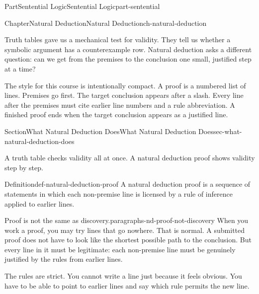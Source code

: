 \documentclass[oneside,10pt,]{book}
\newcommand{\terminology}[1]{\textbf{#1}}
\renewcommand{\terminology}[1]{#1}
\begin{document}
\begin{partptx}{Part}{Sentential Logic}{}{Sentential Logic}{}{}{part-sentential}
\renewcommand*{\partname}{Part}
%
%
\typeout{************************************************}
\typeout{************************************************}
%
\begin{chapterptx}{Chapter}{Natural Deduction}{}{Natural Deduction}{}{}{ch-natural-deduction}
\renewcommand*{\chaptername}{Chapter}
\begin{introduction}{}%
Truth tables gave us a mechanical test for validity. They tell us whether a symbolic argument has a counterexample row. Natural deduction asks a different question: can we get from the premises to the conclusion one small, justified step at a time?%
\par
The style for this course is intentionally compact. A proof is a numbered list of lines. Premises go first. The target conclusion appears after a slash. Every line after the premises must cite earlier line numbers and a rule abbreviation. A finished proof ends when the target conclusion appears as a justified line.%
\end{introduction}%
%
%
\typeout{************************************************}
\typeout{************************************************}
%
\begin{sectionptx}{Section}{What Natural Deduction Does}{}{What Natural Deduction Does}{}{}{sec-what-natural-deduction-does}
\begin{introduction}{}%
A truth table checks validity all at once. A natural deduction proof shows validity step by step.%
\end{introduction}%
\begin{definition}{Definition}{}{def-natural-deduction-proof}%
A \terminology{natural deduction proof} is a sequence of statements in which each non-premise line is licensed by a rule of inference applied to earlier lines.%
\end{definition}
\begin{paragraphs}{Proof is not the same as discovery.}{paragraphs-nd-proof-not-discovery}%
When you work a proof, you may try lines that go nowhere. That is normal. A submitted proof does not have to look like the shortest possible path to the conclusion. But every line in it must be legitimate: each non-premise line must be genuinely justified by the rules from earlier lines.%
\par
The rules are strict. You cannot write a line just because it feels obvious. You have to be able to point to earlier lines and say which rule permits the new line.%

\end{paragraphs}
\end{sectionptx}
\end{chapterptx}
\end{partptx}
\end{document}
